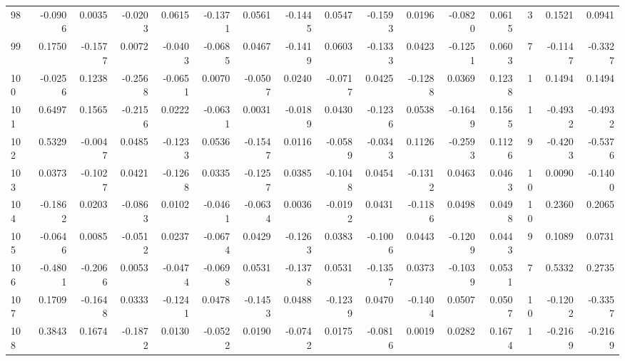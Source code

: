 \begin{tabular}{lrrrrrrrrrrrrrrr}
98  &     -0.0906 &  0.0035 & -0.0203 &  0.0615 & -0.1371 &  0.0561 & -0.1445 &  0.0547 & -0.1593 &  0.0196 &  -0.0820 &     0.0615 &      3 &                    0.1521 &                     0.0941 \\
99  &      0.1750 & -0.1577 &  0.0072 & -0.0403 & -0.0685 &  0.0467 & -0.1419 &  0.0603 & -0.1333 &  0.0423 &  -0.1251 &     0.0603 &      7 &                   -0.1147 &                    -0.3327 \\
100 &     -0.0256 &  0.1238 & -0.2568 & -0.0651 &  0.0070 & -0.0507 &  0.0240 & -0.0717 &  0.0425 & -0.1288 &   0.0369 &     0.1238 &      1 &                    0.1494 &                     0.1494 \\
101 &      0.6497 &  0.1565 & -0.2156 &  0.0222 & -0.0631 &  0.0031 & -0.0189 &  0.0430 & -0.1236 &  0.0538 &  -0.1649 &     0.1565 &      1 &                   -0.4932 &                    -0.4932 \\
102 &      0.5329 & -0.0047 &  0.0485 & -0.1233 &  0.0536 & -0.1547 &  0.0116 & -0.0589 & -0.0343 &  0.1126 &  -0.2593 &     0.1126 &      9 &                   -0.4203 &                    -0.5376 \\
103 &      0.0373 & -0.1027 &  0.0421 & -0.1268 &  0.0335 & -0.1257 &  0.0385 & -0.1048 &  0.0454 & -0.1312 &   0.0463 &     0.0463 &     10 &                    0.0090 &                    -0.1400 \\
104 &     -0.1862 &  0.0203 & -0.0863 &  0.0102 & -0.0461 & -0.0634 &  0.0036 & -0.0192 &  0.0431 & -0.1186 &   0.0498 &     0.0498 &     10 &                    0.2360 &                     0.2065 \\
105 &     -0.0646 &  0.0085 & -0.0512 &  0.0237 & -0.0674 &  0.0429 & -0.1263 &  0.0383 & -0.1006 &  0.0443 &  -0.1209 &     0.0443 &      9 &                    0.1089 &                     0.0731 \\
106 &     -0.4801 & -0.2066 &  0.0053 & -0.0474 & -0.0698 &  0.0531 & -0.1378 &  0.0531 & -0.1357 &  0.0373 &  -0.1039 &     0.0531 &      7 &                    0.5332 &                     0.2735 \\
107 &      0.1709 & -0.1648 &  0.0333 & -0.1241 &  0.0478 & -0.1453 &  0.0488 & -0.1239 &  0.0470 & -0.1404 &   0.0507 &     0.0507 &     10 &                   -0.1202 &                    -0.3357 \\
108 &      0.3843 &  0.1674 & -0.1872 &  0.0130 & -0.0522 &  0.0190 & -0.0742 &  0.0175 & -0.0816 &  0.0019 &   0.0282 &     0.1674 &      1 &                   -0.2169 &                    -0.2169 \\

\end{tabular}
